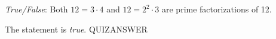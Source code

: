 \documentclass[11pt,letterpaper]{article}
\begin{document}
\thispagestyle{title}


\quizsol \textit{True/False}: Both $12= 3 \cdot 4$ and $12= 2^2 \cdot 3$ are prime factorizations of 12.  \pspace

\sol The statement is \textit{true}. QUIZANSWER \pvspace{0.5cm}
\end{document}
